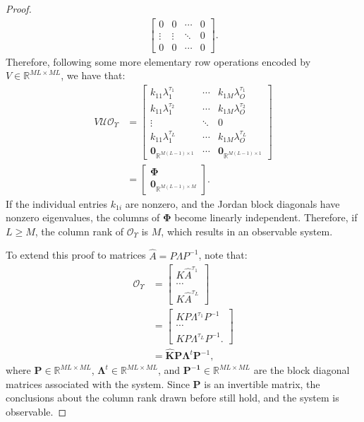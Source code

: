 \documentclass[letterpaper,12pt,peerreviewca,draftcls]{IEEEtran}
\newcommand{\la}{\lambda}
\newcommand{\R}{\mathbb{R}}
\newcommand{\kernel}{k}
\newcommand{\empK}{\ensuremath{K}}
\newcommand{\ncent}{M}
\newcommand{\Obs}{\mathcal{O}}
\newcommand{\otime}{L}
\newcommand{\JorMul}{O}
\newcommand{\Tset}{\Upsilon}
\newcommand{\JorP}{P}
\newcommand{\JorLa}{\Lambda}
\newcommand{\dualop}{A}
\newcommand{\dualopApprox}{\widehat{\dualop}}
\newcommand{\tindex}{\tau}
\newcommand{\catempK}{\widehat{\mathbf{K}}}
\newcommand{\catJorP}{\boldsymbol{\JorP}}
\newcommand{\catJorLa}{\boldsymbol{\JorLa}}
\newcommand{\zerosMat}[2]{\mathbf{0}_{\R^{#1\times#2}}}
\newcommand{\bdU}{\mathcal{U}}
\begin{document}
\begin{proof}
\begin{align*}
\begin{bmatrix}
	0 & 0 & \cdots & 0\\
	\vdots & \vdots & \ddots & 0\\
	0 & 0 & \cdots & 0
	\end{bmatrix}.  
	\end{align*}
	Therefore, following some more elementary row operations encoded by $V\in\R^{\ncent\otime\times\ncent\otime}$, we have that:
	\begin{align*}
	V \bdU\Obs_{\Tset}
	&= 
	\begin{bmatrix}
	\kernel_{11}\la_1^{\tindex_1} & \cdots & \kernel_{1\ncent}\la_{\JorMul}^{\tindex_1}\\
	\kernel_{11}\la_1^{\tindex_2} & \cdots & \kernel_{1\ncent}\la_{\JorMul}^{\tindex_2}\\
	\vdots & \ddots & 0\\
	\kernel_{11}\la_1^{\tindex_{\otime}} & \cdots 
	& \kernel_{1\ncent}\la_{\JorMul}^{\tindex_{\otime}}\\
	\zerosMat{\ncent(\otime-1)}{1} & \cdots & \zerosMat{\ncent(\otime-1)}{1}
	\end{bmatrix}\\
	&= 
	\begin{bmatrix}
	\boldsymbol{\Phi}\\
	\zerosMat{\ncent(\otime-1)}{\ncent}
	\end{bmatrix}.
	\end{align*}
	If the individual entries $\kernel_{1i}$ are nonzero, and the Jordan block diagonals have nonzero eigenvalues, the columns of $\boldsymbol\Phi$
	become linearly independent. Therefore, if $\otime \geq \ncent$, the column rank of $\Obs_{\Tset}$ is $\ncent$, which results in an observable system.
	
	To extend this proof to matrices $\dualopApprox = \JorP\JorLa\JorP^{-1}$, note that:
	\begin{align*}
	\Obs_{\Tset} &= 
	\begin{bmatrix}
	\empK \dualopApprox^{\tindex_1}\\
	\cdots\\
	\empK \dualopApprox^{\tindex_\otime}
	\end{bmatrix}\\
	&=
	\begin{bmatrix}
	\empK \JorP\JorLa^{\tindex_1}\JorP^{-1}\\
	\cdots\\
	\empK \JorP\JorLa^{\tindex_\otime}\JorP^{-1}.
	\end{bmatrix}\\
	&=
	\catempK
	\catJorP
	\catJorLa^t
	\catJorP^{-1},
	\end{align*} 
	where $\catJorP\in\R^{\ncent\otime\times\ncent\otime}$, $\catJorLa^t\in\R^{\ncent\otime\times\ncent\otime}$, and
	$\boldsymbol{\JorP^{-1}}\in\R^{\ncent\otime\times\ncent\otime}$ are the block diagonal matrices associated with the system. 
	Since $\catJorP$ is an invertible matrix, the conclusions about the column rank drawn before still hold, and the system is observable. 
\end{proof}
\end{document}

